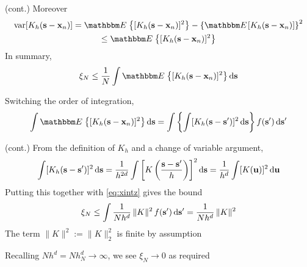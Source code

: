 \begin{frame}

    \vspace{2em}
    \Prf (cont.)
    Moreover 
    \begin{multline*}
    \var[ K_h(\bolds - \boldx_n) ]
    = \EE \left\{ [ K_h(\bolds - \boldx_n) ]^2 \right\}
    - \left\{ \EE[ K_h(\bolds - \boldx_n)]  \right\}^2
    \\ \leq 
    \EE \left\{ [ K_h(\bolds - \boldx_n) ]^2 \right\}
    \end{multline*}
    In summary,
    \begin{equation*}
        \label{eq:xintz}
        \xi_N \leq 
        \frac{1}{N}
        \int 
        \EE \left\{ [ K_h(\bolds - \boldx_n) ]^2 \right\}
            \diff \bolds
    \end{equation*}
    
    \vspace{.7em}
    Switching the order of integration,
    \begin{equation*}
        \int 
        \EE \left\{ [ K_h(\bolds - \boldx_n) ]^2 \right\}
            \diff \bolds
        =
        \int 
        \left\{
            \int [ K_h(\bolds - \bolds') ]^2 \diff \bolds
        \right\}
            f(\bolds') \diff \bolds'
    \end{equation*}

\end{frame}

\begin{frame}

    \vspace{2em}
    \Prf (cont.)
    From the definition of $K_h$ and a change of variable argument,
    \begin{equation*}
        \int [ K_h({\mathbf s} - {\mathbf s}') ]^2 \mathop{}\!\mathrm{d} {\mathbf s}
         = \frac{1}{h^{2d}}
            \int \left[ K \left( 
            \frac{{\mathbf s} - {\mathbf s}'}{h} 
                     \right) 
                 \right]^2 \mathop{}\!\mathrm{d} {\mathbf s}
         = \frac{1}{h^d}
            \int [ K ({\mathbf u}) ]^2 \mathop{}\!\mathrm{d} {\mathbf u}
    \end{equation*}
    Putting this together with \eqref{eq:xintz} gives the bound
    \begin{equation*}
        \xi_N 
        \leq 
        \int 
        \frac{1}{Nh^d} \, \| K \|^2  \, f({\mathbf s}') \mathop{}\!\mathrm{d} {\mathbf s}'
        = \frac{1}{Nh^d}  \,\| K \|^2 
    \end{equation*}
    The term $\| K \|^2 := \| K \|^2_2$ is finite by assumption
    
    Recalling $Nh^d =
    Nh^d_N \to \infty$, we see $\xi_N \to 0$ as required \qedsymbol
    
\end{frame}


